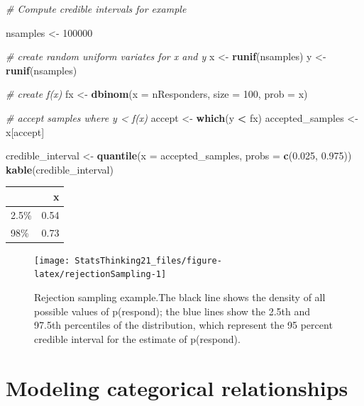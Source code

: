 \documentclass[12pt,]{book}
\newenvironment{Shaded}{\begin{snugshade}}{\end{snugshade}}
\newcommand{\CommentTok}[1]{\textcolor[rgb]{0.56,0.35,0.01}{\textit{#1}}}
\newcommand{\DataTypeTok}[1]{\textcolor[rgb]{0.13,0.29,0.53}{#1}}
\newcommand{\DecValTok}[1]{\textcolor[rgb]{0.00,0.00,0.81}{#1}}
\newcommand{\FloatTok}[1]{\textcolor[rgb]{0.00,0.00,0.81}{#1}}
\newcommand{\KeywordTok}[1]{\textcolor[rgb]{0.13,0.29,0.53}{\textbf{#1}}}
\newcommand{\NormalTok}[1]{#1}
\newcommand{\OperatorTok}[1]{\textcolor[rgb]{0.81,0.36,0.00}{\textbf{#1}}}
\newcommand{\StringTok}[1]{\textcolor[rgb]{0.31,0.60,0.02}{#1}}
\theoremstyle{definition}
\theoremstyle{definition}
\theoremstyle{definition}
\theoremstyle{remark}
\begin{document}
\begin{Shaded}
\begin{Highlighting}[]
\CommentTok{# Compute credible intervals for example}

\NormalTok{nsamples <-}\StringTok{ }\DecValTok{100000}

\CommentTok{# create random uniform variates for x and y}
\NormalTok{x <-}\StringTok{ }\KeywordTok{runif}\NormalTok{(nsamples)}
\NormalTok{y <-}\StringTok{ }\KeywordTok{runif}\NormalTok{(nsamples)}

\CommentTok{# create f(x)}
\NormalTok{fx <-}\StringTok{ }\KeywordTok{dbinom}\NormalTok{(}\DataTypeTok{x =}\NormalTok{ nResponders, }\DataTypeTok{size =} \DecValTok{100}\NormalTok{, }\DataTypeTok{prob =}\NormalTok{ x)}

\CommentTok{# accept samples where y < f(x)}
\NormalTok{accept <-}\StringTok{ }\KeywordTok{which}\NormalTok{(y }\OperatorTok{<}\StringTok{ }\NormalTok{fx)}
\NormalTok{accepted_samples <-}\StringTok{ }\NormalTok{x[accept]}

\NormalTok{credible_interval <-}\StringTok{ }\KeywordTok{quantile}\NormalTok{(}\DataTypeTok{x =}\NormalTok{ accepted_samples, }
                              \DataTypeTok{probs =} \KeywordTok{c}\NormalTok{(}\FloatTok{0.025}\NormalTok{, }\FloatTok{0.975}\NormalTok{))}
\KeywordTok{kable}\NormalTok{(credible_interval)}
\end{Highlighting}
\end{Shaded}

\begin{tabular}{l|r}
\hline
  & x\\
\hline
2.5\% & 0.54\\
\hline
98\% & 0.73\\
\hline
\end{tabular}

\begin{figure}
\texttt{[image: StatsThinking21\_files/figure-latex/rejectionSampling-1]} \caption{Rejection sampling example.The black line shows the density of all possible values of p(respond); the blue lines show the 2.5th and 97.5th percentiles of the distribution, which represent the 95 percent credible interval for the estimate of p(respond).}\label{fig:rejectionSampling}
\end{figure}

\hypertarget{modeling-categorical-relationships}{%
\chapter{Modeling categorical relationships}\label{modeling-categorical-relationships}}
\end{document}
